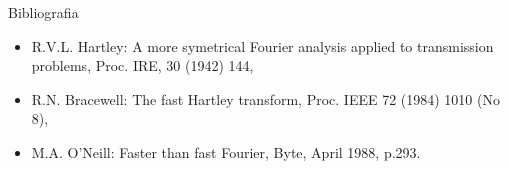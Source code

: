 \begin{frame}{Bibliografia}
	\begin{itemize}
		\item R.V.L. Hartley: A more symetrical Fourier analysis applied to transmission problems, Proc. IRE, 30 (1942) 144, \\
		\item R.N. Bracewell: The fast Hartley transform, Proc. IEEE 72 (1984) 1010 (No 8), \\
		\item M.A. O'Neill: Faster than fast Fourier, Byte, April 1988, p.293. 
	\end{itemize}
\end{frame}
